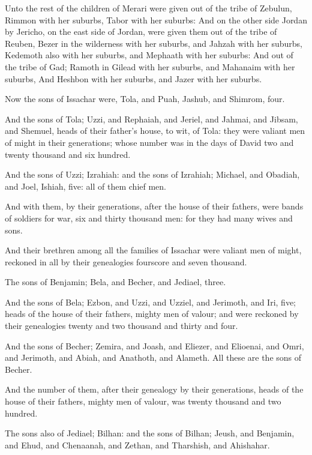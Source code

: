 \Verse Unto the rest of the children of Merari were given out of the tribe of Zebulun, Rimmon with her suburbs, Tabor with her suburbs: \Verse And on the other side Jordan by Jericho, on the east side of Jordan, were given them out of the tribe of Reuben, Bezer in the wilderness with her suburbs, and Jahzah with her suburbs, \Verse Kedemoth also with her suburbs, and Mephaath with her suburbs: \Verse And out of the tribe of Gad; Ramoth in Gilead with her suburbs, and Mahanaim with her suburbs, \Verse And Heshbon with her suburbs, and Jazer with her suburbs.


\Chapter
\Verse Now the sons of Issachar were, Tola, and Puah, Jashub, and Shimrom, four.

\Verse And the sons of Tola; Uzzi, and Rephaiah, and Jeriel, and Jahmai, and Jibsam, and Shemuel, heads of their father's house, to wit, of Tola: they were valiant men of might in their generations; whose number was in the days of David two and twenty thousand and six hundred.

\Verse And the sons of Uzzi; Izrahiah: and the sons of Izrahiah; Michael, and Obadiah, and Joel, Ishiah, five: all of them chief men.

\Verse And with them, by their generations, after the house of their fathers, were bands of soldiers for war, six and thirty thousand men: for they had many wives and sons.

\Verse And their brethren among all the families of Issachar were valiant men of might, reckoned in all by their genealogies fourscore and seven thousand.

\Verse The sons of Benjamin; Bela, and Becher, and Jediael, three.

\Verse And the sons of Bela; Ezbon, and Uzzi, and Uzziel, and Jerimoth, and Iri, five; heads of the house of their fathers, mighty men of valour; and were reckoned by their genealogies twenty and two thousand and thirty and four.

\Verse And the sons of Becher; Zemira, and Joash, and Eliezer, and Elioenai, and Omri, and Jerimoth, and Abiah, and Anathoth, and Alameth. All these are the sons of Becher.

\Verse And the number of them, after their genealogy by their generations, heads of the house of their fathers, mighty men of valour, was twenty thousand and two hundred.

\Verse The sons also of Jediael; Bilhan: and the sons of Bilhan; Jeush, and Benjamin, and Ehud, and Chenaanah, and Zethan, and Tharshish, and Ahishahar.

